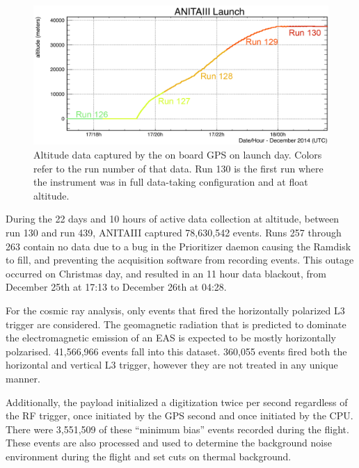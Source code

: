 \begin{figure}
	\centering
	\includegraphics[width=\textwidth]{figures/LaunchAltitude}
	\caption{Altitude data captured by the on board GPS on launch day.  Colors refer to the run number of that data.  Run 130 is the first run where the instrument was in full data-taking configuration and at float altitude.}
	\label{fig:AnitaLaunchAltitude}
\end{figure}	

		During the 22 days and 10 hours of active data collection at altitude, between run 130 and run 439, ANITAIII captured 78,630,542 events.  Runs 257 through 263 contain no data due to a bug in the Prioritizer daemon causing the Ramdisk to fill, and preventing the acquisition software from recording events.  This outage occurred on Christmas day, and resulted in an 11 hour data blackout, from December 25th at 17:13 to December 26th at 04:28.
		
		For the cosmic ray analysis, only events that fired the horizontally polarized L3 trigger are considered. The geomagnetic radiation that is predicted to dominate the electromagnetic emission of an EAS is expected to be mostly horizontally polzarised. 41,566,966 events fall into this dataset.  360,055 events fired both the horizontal and vertical L3 trigger, however they are not treated in any unique manner.
		
		Additionally, the payload initialized a digitization twice per second regardless of the RF trigger, once initiated by the GPS second and once initiated by the CPU.  There were 3,551,509 of these ``minimum bias'' events recorded during the flight.  These events are also processed and used to determine the background noise environment during the flight and set cuts on thermal background.
		
	
